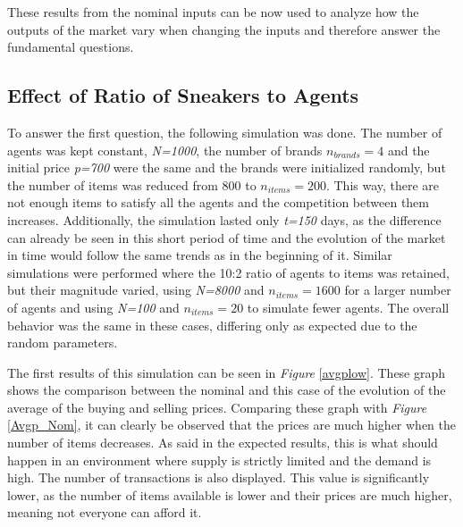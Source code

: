 \documentclass[12pt]{article}
\begin{document}
\vspace{5cm}

These results from the nominal inputs can be now used to analyze how the outputs of the market vary when changing the inputs and therefore answer the fundamental questions.

\subsection{Effect of Ratio of Sneakers to Agents}
\label{effrat}

To answer the first question, the following simulation was done. The number of agents was kept constant, \textit{N=1000}, the number of brands \textit{$n_{brands} = 4$} and the initial price \textit{p=700} were the same and the brands were initialized randomly, but the number of items was reduced from 800 to \textit{$n_{items}=200$}. This way, there are not enough items to satisfy all the agents and the competition between them increases. Additionally, the simulation lasted only \textit{t=150} days, as the difference can already be seen in this short period of time and the evolution of the market in time would follow the same trends as in the beginning of it. Similar simulations were performed where the 10:2 ratio of agents to items was retained, but their magnitude varied, using \textit{N=8000} and \textit{$n_{items}=1600$} for a larger number of agents and using \textit{N=100} and \textit{$n_{items}=20$} to simulate fewer agents. The overall behavior was the same in these cases, differing only as expected due to the random parameters.

The first results of this simulation can be seen in \textit{Figure} \ref{avgplow}. These graph shows the comparison between the nominal and this case of the evolution of the average of the buying and selling prices. Comparing these graph with \textit{Figure} \ref{Avgp_Nom}, it can clearly be observed that the prices are much higher when the number of items decreases. As said in the expected results, this is what should happen in an environment where supply is strictly limited and the demand is high. The number of transactions is also displayed. This value is significantly lower, as the number of items available is lower and their prices are much higher, meaning not everyone can afford it. 
\end{document}
